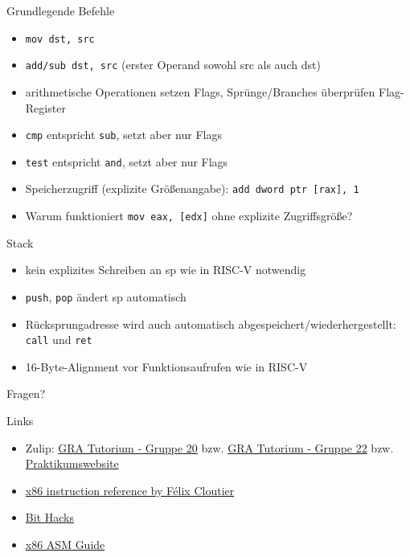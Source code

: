 \documentclass[
  german,            %
  aspectratio=169,    %
]{tumbeamer}
\begin{document}
\begin{frame}[c, fragile]{Grundlegende Befehle}{}
  \begin{itemize}
    \item \verb|mov dst, src|
    \item \verb|add/sub dst, src| (erster Operand sowohl src als auch dst)
    \item arithmetische Operationen setzen Flags, Sprünge/Branches überprüfen Flag-Register
    \item \verb|cmp| entspricht \verb|sub|, setzt aber nur Flags
    \item \verb|test| entspricht \verb|and|, setzt aber nur Flags
    \item Speicherzugriff (explizite Größenangabe): \verb|add dword ptr [rax], 1|
    \item Warum funktioniert \verb|mov eax, [edx]| ohne explizite Zugriffsgröße?
  \end{itemize}
\end{frame}

\begin{frame}[c, fragile]{Stack}{}
  \begin{itemize}
    \item kein explizites Schreiben an sp wie in RISC-V notwendig
    \item \verb|push|, \verb|pop| ändert sp automatisch
    \item Rücksprungadresse wird auch automatisch abgespeichert/wiederhergestellt: \verb|call| und \verb|ret|
    \item 16-Byte-Alignment vor Funktionsaufrufen wie in RISC-V
  \end{itemize}
\end{frame}

\begin{frame}[c]{}{}
  \begin{center}
    \LARGE Fragen?
  \end{center}
\end{frame}

\begin{frame}[fragile, c]{Links}{}
  \begin{itemize}
    \item Zulip: \href{https://zulip.in.tum.de/#narrow/stream/2267-GRA-Tutorium---Gruppe-20}{\glqq GRA Tutorium - Gruppe 20\grqq}
          bzw. \href{https://zulip.in.tum.de/#narrow/stream/2269-GRA-Tutorium---Gruppe-22}{\glqq GRA Tutorium - Gruppe 22\grqq}
          bzw. \href{https://gra.caps.in.tum.de}{\glqq Praktikumswebsite\grqq}
    \item \href{https://www.felixcloutier.com/x86/}{x86 instruction reference by Félix Cloutier}
    \item \href{https://graphics.stanford.edu/~seander/bithacks.html#CountBitsSetParallel}{Bit Hacks}
    \item \href{https://flint.cs.yale.edu/cs421/papers/x86-asm/asm.html}{x86 ASM Guide}
  \end{itemize}
\end{frame}

\maketitle
\end{document}
